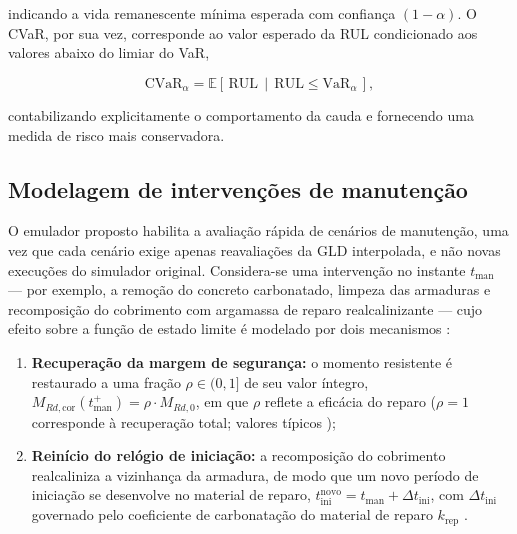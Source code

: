 \noindent indicando a vida remanescente mínima esperada com confiança $(1-\alpha)$. O CVaR, por sua vez, corresponde ao valor esperado da RUL condicionado aos valores abaixo do limiar do VaR,

\begin{equation}
\mathrm{CVaR}_\alpha = \mathbb{E}\left[\, \mathrm{RUL} \,\middle|\, \mathrm{RUL} \leq \mathrm{VaR}_\alpha \,\right],
\label{eq:cvar}
\end{equation}

\noindent contabilizando explicitamente o comportamento da cauda e fornecendo uma medida de risco mais conservadora.

\subsection{Modelagem de intervenções de manutenção}
\label{subsec:manutencao}

O emulador proposto habilita a avaliação rápida de cenários de manutenção, uma vez que cada cenário exige apenas reavaliações da GLD interpolada, e não novas execuções do simulador original. Considera-se uma intervenção no instante $t_{\mathrm{man}}$ --- por exemplo, a remoção do concreto carbonatado, limpeza das armaduras e recomposição do cobrimento com argamassa de reparo realcalinizante --- cujo efeito sobre a função de estado limite é modelado por dois mecanismos \citep{frangopol2011, vannoortwijk2009}:

\begin{enumerate}
    \item \textbf{Recuperação da margem de segurança:} o momento resistente é restaurado a uma fração $\rho \in (0, 1]$ de seu valor íntegro, $M_{Rd,\mathrm{cor}}(t_{\mathrm{man}}^{+}) = \rho \cdot M_{Rd,0}$, em que $\rho$ reflete a eficácia do reparo ($\rho = 1$ corresponde à recuperação total; valores típicos );
    \item \textbf{Reinício do relógio de iniciação:} a recomposição do cobrimento realcaliniza a vizinhança da armadura, de modo que um novo período de iniciação se desenvolve no material de reparo, $t_{\mathrm{ini}}^{\mathrm{novo}} = t_{\mathrm{man}} + \Delta t_{\mathrm{ini}}$, com $\Delta t_{\mathrm{ini}}$ governado pelo coeficiente de carbonatação do material de reparo $k_{\mathrm{rep}}$ .
\end{enumerate}


